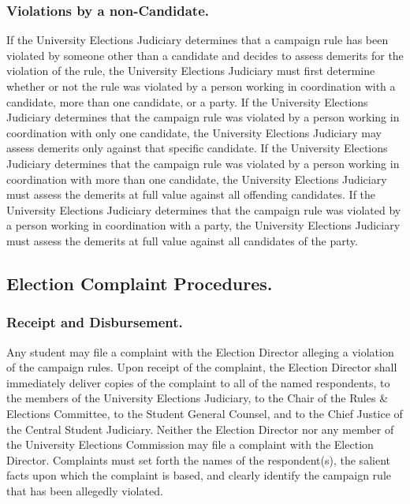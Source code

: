 \subsubsection{Violations by a non-Candidate.}
\subsubsubsection{}
If the University Elections Judiciary determines that a campaign rule has been violated by someone other than a candidate and decides to assess demerits for the violation of the rule, the University Elections Judiciary must first determine whether or not the rule was violated by a person working in coordination with a candidate, more than one candidate, or a party.
\subsubsubsection{}
If the University Elections Judiciary determines that the campaign rule was violated by a person working in coordination with only one candidate, the University Elections Judiciary may assess demerits only against that specific candidate.
\subsubsubsection{}
If the University Elections Judiciary determines that the campaign rule was violated by a person working in coordination with more than one candidate, the University Elections Judiciary must assess the demerits at full value against all offending candidates.
\subsubsubsection{}
If the University Elections Judiciary determines that the campaign rule was violated by a person working in coordination with a party, the University Elections Judiciary must assess the demerits at full value against all candidates of the party.

\subsection{Election Complaint Procedures.}
\subsubsection{Receipt and Disbursement.}
\subsubsubsection{}
Any student may file a complaint with the Election Director alleging a violation of the campaign rules.  Upon receipt of the complaint, the Election Director shall immediately deliver copies of the complaint to all of the named respondents, to the members of the University Elections Judiciary, to the Chair of the Rules \& Elections Committee, to the Student General Counsel, and to the Chief Justice of the Central Student Judiciary.
\subsubsubsection{}
Neither the Election Director nor any member of the University Elections Commission may file a complaint with the Election Director.
\subsubsubsection{}
Complaints must set forth the names of the respondent(s), the salient facts upon which the complaint is based, and clearly identify the campaign rule that has been allegedly violated.
